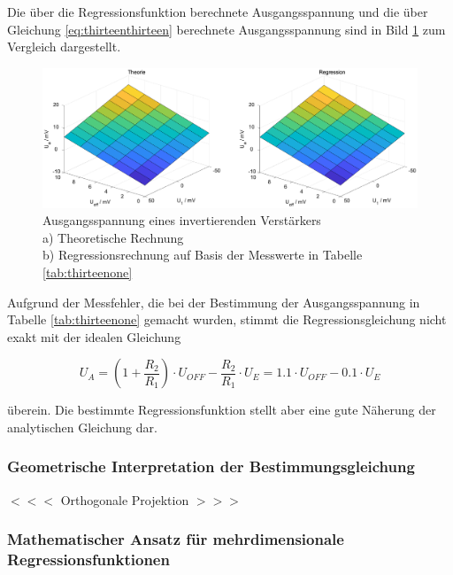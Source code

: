 \noindent Die \"{u}ber die Regressionsfunktion berechnete Ausgangsspannung und die \"{u}ber Gleichung \eqref{eq:thirteenthirteen} berechnete Ausgangsspannung sind in Bild \ref{fig:Verstaerkerschaltung} zum Vergleich dargestellt.

\clearpage

\noindent 
\begin{figure}[H]
  \centerline{\includegraphics[width=1\textwidth]{Kapitel13/Bilder/image1}}
  \caption{Ausgangsspannung eines invertierenden Verst\"{a}rkers\\
  a) Theoretische Rechnung\\
  b) Regressionsrechnung auf Basis der Messwerte in Tabelle \ref{tab:thirteenone}}
  \label{fig:Verstaerkerschaltung}
\end{figure}

\noindent Aufgrund der Messfehler, die bei der Bestimmung der Ausgangsspannung in Tabelle \ref{tab:thirteenone} gemacht wurden, stimmt die Regressionsgleichung nicht exakt mit der idealen Gleichung

\begin{equation}\label{eq:thirteeneighteen}
U_{A} =\left(1+\frac{R_{2}}{R_{1}} \right)\cdot U_{OFF} -\frac{R_{2} }{R_{1}} \cdot U_{E} =1.1\cdot U_{OFF} -0.1\cdot U_{E}
\end{equation}

\noindent \"{u}berein. Die bestimmte Regressionsfunktion stellt aber eine gute N\"{a}herung der analytischen Gleichung dar. 

\subsubsection{Geometrische Interpretation der Bestimmungsgleichung}

\noindent $<<<$ Orthogonale Projektion $>>>$

\subsubsection{Mathematischer Ansatz f\"{u}r mehrdimensionale Regressionsfunktionen}

